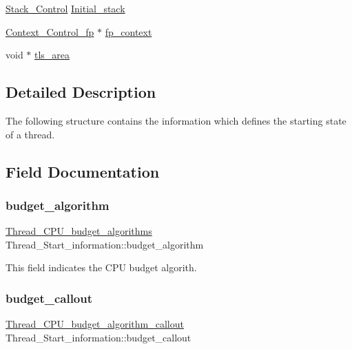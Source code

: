 \begin{DoxyCompactItemize}
\mbox{\hyperlink{structStack__Control}{Stack\+\_\+\+Control}} \mbox{\hyperlink{structThread__Start__information_a04807333fe5e2cc7ff36c77ccc1f2b83}{Initial\+\_\+stack}}
\item 
\mbox{\hyperlink{structContext__Control__fp}{Context\+\_\+\+Control\+\_\+fp}} $\ast$ \mbox{\hyperlink{structThread__Start__information_af7db32dda5575506b33c061e0ba318ac}{fp\+\_\+context}}
\item 
void $\ast$ \mbox{\hyperlink{structThread__Start__information_a7692b5498bfcad18439b10b4a4baa8d2}{tls\+\_\+area}}
\end{DoxyCompactItemize}


\subsection{Detailed Description}
The following structure contains the information which defines the starting state of a thread. 

\subsection{Field Documentation}
\mbox{\label{structThread__Start__information_aab4f4dccde0c7691ac31e95fcee691ca}} 
\subsubsection{\texorpdfstring{budget\_algorithm}{budget\_algorithm}}
{\footnotesize\ttfamily \mbox{\hyperlink{group__RTEMSScoreThread_gab6f48556812ffc781a69df144ef49be0}{Thread\+\_\+\+C\+P\+U\+\_\+budget\+\_\+algorithms}} Thread\+\_\+\+Start\+\_\+information\+::budget\+\_\+algorithm}

This field indicates the C\+PU budget algorith. \mbox{\label{structThread__Start__information_a2153af1919ee0ef1d7dc7db46e084d14}} 
\subsubsection{\texorpdfstring{budget\_callout}{budget\_callout}}
{\footnotesize\ttfamily \mbox{\hyperlink{group__RTEMSScoreThread_ga2f15cbe9653e5bfcb2595454e9ffd14a}{Thread\+\_\+\+C\+P\+U\+\_\+budget\+\_\+algorithm\+\_\+callout}} Thread\+\_\+\+Start\+\_\+information\+::budget\+\_\+callout}

